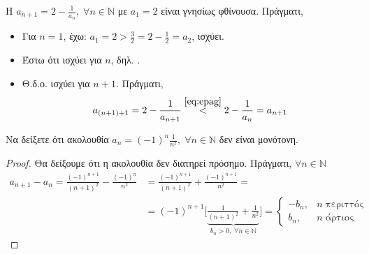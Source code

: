 \documentclass[main.tex]{subfiles}
\begin{document}
\begin{examples}
\begin{enumerate}[i)]
    \item Η $ a_{n+1}=2 - \frac{1}{a_{n}}, \; \forall n \in \mathbb{N}
      $ με $ a_{1} = 2 $ είναι γνησίως φθίνουσα. Πράγματι, 
      \begin{itemize}
        \item Για $ n=1 $, έχω: $ a_{1}= 2 >
          \frac{3}{2} = 2 - \frac{1}{2} = a_{2}$, ισχύει.
        \item Έστω ότι ισχύει για $n$, δηλ.
          .
        \item Θ.δ.ο. ισχύει για $ n+1 $. Πράγματι, 
          \[
            a_{(n+1)+1}=2- \frac{1}{a_{n+1}}
            \overset{\eqref{eq:epag}}{<} 2 - 
            \frac{1}{a_{n}} = a_{n+1}
          \] 
      \end{itemize}

    \item Να δείξετε ότι ακολουθία $ a_{n} = (-1)^{n} \frac{1}{n^{2}}, 
      \; \forall n \in \mathbb{N} $ 
      δεν είναι μονότονη.

      \begin{proof}
      \item {}
        Θα δείξουμε ότι η ακολουθία δεν διατηρεί πρόσημο. Πράγματι, 
        $ \forall n \in \mathbb{N} $
        \begin{align*}
          a_{n+1}- a_{n} = \frac{(-1)^{n+1}}{(n+1)^{2}} - 
          \frac{(-1)^{n}} {n^{2}} 
                        &= \frac{(-1)^{n+1}}{(n+1)^{2}} + 
                        \frac{(-1)^{n+1}}{n^{2}}= \\
                        &= (-1)^{n+1}\Biggl[\underbrace{\frac{1}{(n+1)^{2}} + 
                            \frac{1}{n^{2}}}_{b_{n} > 0, \; \forall n \in 
                        \mathbb{N}}\Biggr] 
                        = \begin{cases}
                          -b_{n}, & n \; \text{περιττός} \\
                          b_{n}, & n \; \text{άρτιος} 
                        \end{cases}
        \end{align*} 
      \end{proof}
  \end{enumerate}
\end{examples}

\end{document}
